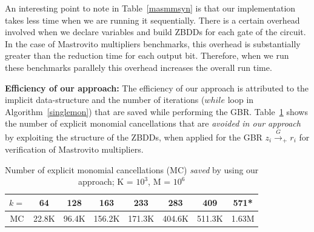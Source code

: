 \par An interesting point to note in Table~\ref{masmmsyn} is that
our implementation takes less time when we are running it
sequentially. There is a certain overhead involved when we declare
variables and build ZBDDs for each gate of the circuit. In the case of
Mastrovito multipliers benchmarks, this overhead is substantially
greater than the reduction time for each output bit. Therefore, when
we run these benchmarks parallely this overhead increases the overall
run time.  
 
{\bf Efficiency of our approach:} The efficiency of our approach is
attributed to the implicit data-structure and the number of iterations
($while$ loop in Algorithm~\ref{singlemon}) that are saved while
performing the GBR. Table~\ref{monomsave} shows  
the number of explicit monomial cancellations
that are {\it avoided in our approach} by exploiting the structure of the
ZBDDs, when applied for the GBR $z_i\xrightarrow{G}_+ r_i$ for
verification of Mastrovito multipliers.  

\begin{table}[H]
\centering
\caption{Number of explicit monomial cancellations (MC) {\it saved} by using
  our approach; K = $10^3$, M = $10^6$}
\label{monomsave}
\begin{tabular}{| c | c | c | c | c | c | c | c |} \hline
$k=$& 64 &128 &163 &233 & 283& 409 & 571* \\ \hline
MC& 22.8K&96.4K & 156.2K& 171.3K& 404.6K& 511.3K& 1.63M\\ \hline
\end{tabular}
\end{table}

